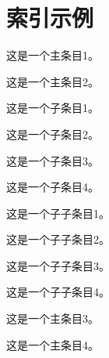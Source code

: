 \chapter{索引示例}

这是一个主条目1。

这是一个主条目2。

这是一个子条目1。

这是一个子条目2。

这是一个子条目3。

这是一个子条目4。

这是一个子子条目1。

这是一个子子条目2。

这是一个子子条目3。

这是一个子子条目4。

这是一个主条目3。

这是一个主条目4。
